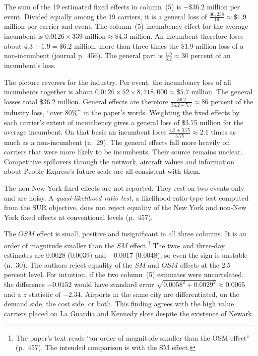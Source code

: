 The sum of the 19 estimated fixed effects in column~(5) is $-\$36.2$ million per event. Divided equally
among the 19 carriers, it is a general loss of $\frac{36{,}238}{19}\approx\$1.9$ million per carrier
and event. The column~(5) incumbency effect for the average incumbent is
$0.0126\times339\text{ million}\approx\$4.3$ million. An incumbent therefore loses about
$4.3+1.9=\$6.2$ million, more than three times the \$1.9 million loss of a non-incumbent (journal
p.~456). The general part is $\frac{1.9}{6.2}\approx30$ percent of an incumbent's loss.

The picture reverses for the industry. Per event, the incumbency loss of all incumbents together is
about $0.0126\times52\times8{,}718{,}000\approx\$5.7$ million. The general losses total
\$36.2 million. General effects are therefore $\frac{36.2}{36.2+5.7}\approx86$ percent of the industry
loss, ``over 80\%'' in the paper's words. Weighting the fixed effects by each carrier's extent of
incumbency gives a general loss of \$3.75 million for the average incumbent. On that basis an
incumbent loses $\frac{4.3+3.75}{3.75}\approx2.1$ times as much as a non-incumbent (n.~29). The
general effects fall more heavily on carriers that were more likely to be incumbents. Their source
remains unclear. Competitive spillovers through the network, aircraft values and information about
People Express's future scale are all consistent with them.

The non-New York fixed effects are not reported. They rest on two events only and are noisy. A
\emph{quasi-likelihood ratio test}, a likelihood-ratio-type test computed from the SUR objective, does not
reject equality of the New York and non-New York fixed effects at conventional levels (p.~457).

The $\mathit{OSM}$ effect is small, positive and insignificant in all three columns. It is an order of
magnitude smaller than the $\mathit{SM}$ effect.\footnote{The paper's text reads ``an order of
magnitude smaller than the OSM effect'' (p.~457). The intended comparison is with the SM
effect.} The two- and three-day estimates are $0.0028$ (0.0039) and $-0.0017$ (0.0048), so even the
sign is unstable (n.~30). The authors reject equality of the $\mathit{SM}$ and $\mathit{OSM}$
effects at the 2.5 percent level. For intuition, if the two column~(5) estimates were uncorrelated,
the difference $-0.0152$ would have standard error $\sqrt{0.0058^2+0.0029^2}\approx0.0065$ and a
$z$ statistic of $-2.34$. Airports in the same city are differentiated, on the demand side, the cost
side, or both. This finding agrees with the high value carriers placed on La Guardia and Kennedy
slots despite the existence of Newark.

